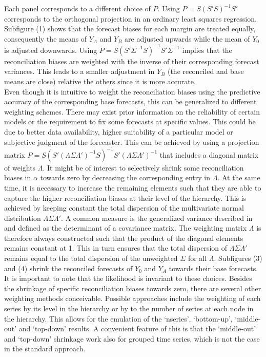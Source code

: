 \documentclass[a4paper,fleqn,11pt]{article}
\begin{document}
Each panel corresponds to a different choice of $P$. Using $P = S(S'S)^{-1}S'$ corresponds to the orthogonal projection in an ordinary least squares regression. Subfigure (1) shows that the forecast biases for each margin are treated equally, consequently the means of $Y_A$ and $Y_B$ are adjusted upwards while the mean of $Y_0$ is adjusted downwards. Using $P = S(S'\Sigma^{-1}S)^{-1}S'\Sigma^{-1}$ implies that the reconciliation biases are weighted with the inverse of their corresponding forecast variances. This leads to a smaller adjustment in $Y_B$ (the reconciled and base means are close) relative the others since it is more accurate.\\

Even though it is intuitive to weight the reconciliation biases using the predictive accuracy of the corresponding base forecasts, this can be generalized to different weighting schemes. There may exist prior information on the reliability of certain models or the requirement to fix some forecasts at specific values. This could be due to better data availability, higher suitability of a particular model or subjective judgment of the forecaster. This can be achieved by using a projection matrix $P= S(S'(\Lambda\Sigma\Lambda')^{-1}S)^{-1}S'(\Lambda\Sigma\Lambda')^{-1}$ that includes a diagonal matrix of weights $\Lambda$. It might be of interest to selectively shrink some reconciliation biases in $\alpha$ towards zero by decreasing the corresponding entry in $\Lambda$. At the same time, it is necessary to increase the remaining elements such that they are able to capture the higher reconciliation biases at their level of the hierarchy. This is achieved by keeping constant the total dispersion of the  multivariate normal distribution $\Lambda\Sigma\Lambda'$. A common measure is the generalized variance described in \cite{Mustonen1997} and defined as the determinant of a covariance matrix. The weighting matrix $\Lambda$ is therefore always constructed such that the product of the diagonal elements remains constant at 1. This in turn ensures that the total dispersion of $\Lambda\Sigma\Lambda'$ remains equal to the total dispersion of the unweighted $\Sigma$ for all $\Lambda$. Subfigures (3) and (4) shrink the reconciled forecasts of $Y_0$ and $Y_A$ towards their base forecasts.\\

It is important to note that the likelihood is invariant to these choices. Besides the shrinkage of specific reconciliation biases towards zero, there are several other weighting methods conceivable.  Possible approaches include the weighting of each series by its level in the hierarchy or by to the number of series at each node in the hierarchy. This allows for the emulation of the `nseries', `bottom-up', `middle-out' and `top-down' results. A convenient feature of this is that the `middle-out' and `top-down' shrinkage work also for grouped time series, which is not the case in the standard approach. \\
\end{document}
